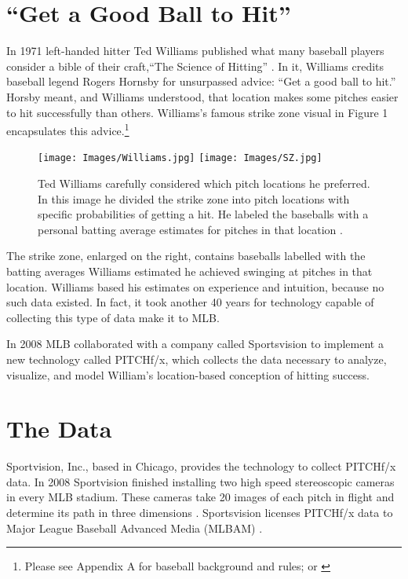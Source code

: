 \section{``Get a Good Ball to Hit''}
In 1971 left-handed hitter Ted Williams published what many baseball players consider a bible of their craft,``The Science of Hitting'' \citep{Williams1971}. In it, Williams credits baseball legend Rogers Hornsby for unsurpassed advice: ``Get a good ball to hit.'' Horsby meant, and Williams understood, that location makes some pitches easier to hit successfully than others. Williams's famous strike zone visual in Figure 1 encapsulates this advice.\footnote{Please see Appendix A for baseball background and rules; or \citep{Wiki}}
        \begin{figure}[H]
      	\centering
      	\texttt{[image: Images/Williams.jpg]} 
      	\texttt{[image: Images/SZ.jpg]}
      	\caption{Ted Williams carefully considered which pitch locations he preferred. In this image he divided the strike zone into pitch locations with specific probabilities of getting a hit. He labeled the baseballs with a personal batting average estimates for pitches in that location \citep{Williams1971}.}
      	\end{figure} 
The strike zone, enlarged on the right, contains baseballs labelled with the batting averages Williams estimated he achieved swinging at pitches in that location. Williams based his estimates on experience and intuition, because no such data existed. In fact, it took another 40 years for technology capable of collecting this type of data make it to MLB\textsuperscript{\textregistered}.

In 2008 MLB collaborated with a company called Sportsvision to implement a new technology called PITCHf/x\textsuperscript{\textregistered}, which collects the data necessary to analyze, visualize, and model William's location-based conception of hitting success.

\section{The Data} %
Sportvision, Inc., based in Chicago, provides the technology to collect PITCHf/x\textsuperscript{\textregistered} data. In 2008 Sportvision finished installing two high speed stereoscopic cameras in every MLB\textsuperscript{\textregistered} stadium. These cameras take 20 images of each pitch in flight and determine its path in three dimensions \citep{Fast2010}. Sportsvision licenses PITCHf/x\textsuperscript{\textregistered} data to Major League Baseball Advanced Media (MLBAM\textsuperscript{\textregistered}) \citep{Baumer2010}. 

